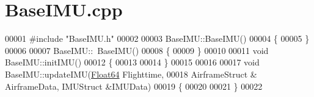 \hypertarget{_base_i_m_u_8cpp_source}{}\section{Base\+I\+M\+U.\+cpp}
\label{_base_i_m_u_8cpp_source}

\begin{DoxyCode}
00001 \textcolor{preprocessor}{#include "BaseIMU.h"}
00002 
00003 BaseIMU::BaseIMU()
00004 \{
00005 \}
00006 
00007 BaseIMU::~BaseIMU()
00008 \{
00009 \}
00010 
00011 \textcolor{keywordtype}{void} BaseIMU::initIMU()
00012 \{
00013 
00014 \}
00015 
00016 
00017 \textcolor{keywordtype}{void} BaseIMU::updateIMU(\hyperlink{group___tools_ga3f1431cb9f76da10f59246d1d743dc2c}{Float64} Flighttime, 
00018                         AirframeStruct & AirframeData,  IMUStruct &IMUData)
00019 \{
00020 
00021 \}
00022 
\end{DoxyCode}
